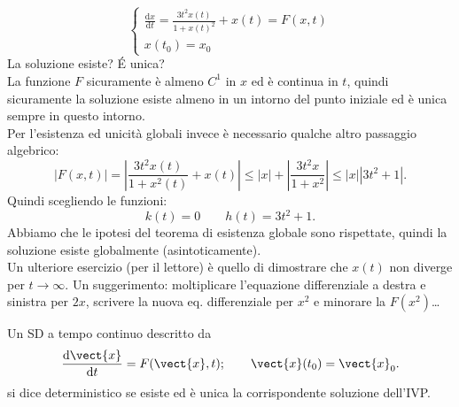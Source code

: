 \noindent
\begin{exmp}
   \[
       \begin{cases}
	   \frac{\text{d} x}{\text{d} t} = \frac{3t^2x(t)}{1+x(t)^2}+x(t) = F(x,t)\\
	   x(t_0)=x_0
       \end{cases}
   \]  
   La soluzione esiste? \'E unica? \\
   La funzione $F$  sicuramente è almeno $C^1$  in $x$  ed è continua in $t$, quindi sicuramente la soluzione esiste almeno in un intorno del punto iniziale ed è unica sempre in questo intorno.\\
   Per l'esistenza ed unicità globali invece è necessario qualche altro passaggio algebrico:
   \[
       \left|F(x,t)\right| = \left|\frac{3t^2x(t)}{1+x^2(t)} + x(t)\right|\le \left|x\right|+\left|\frac{3t^2x}{1+x^2}\right| \le
			    \left|x\right|\left|3t^2+1\right|
   .\] 
   Quindi scegliendo le funzioni:
   \[
       k(t)=0 \qquad h(t)=3t^2+1
   .\] 
   Abbiamo che le ipotesi del teorema di esistenza globale sono rispettate, quindi la soluzione esiste globalmente (asintoticamente).\\
   Un ulteriore esercizio (per il lettore) è quello di dimostrare che $x(t)$ non diverge per $t\to \infty$. Un suggerimento: moltiplicare l'equazione differenziale a destra e sinistra per $2x$, scrivere la nuova eq. differenziale per $x^2$ e minorare la $F(x^2)$\ldots 
\end{exmp}
\noindent
\begin{defn}
    Un SD a tempo continuo descritto da
    \[
	\frac{\text{d} \vect{x}}{\text{d} t} = F(\vect{x},t); \qquad \vect{x} (t_0)=\vect{x}_0
    .\] si dice deterministico se esiste ed è unica la corrispondente soluzione dell'IVP.
\end{defn}
\noindent

